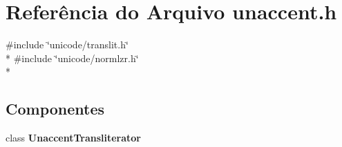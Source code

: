 \section{Referência do Arquivo unaccent.\+h}
\label{unaccent_8h}
{\ttfamily \#include \char`\"{}unicode/translit.\+h\char`\"{}}\\*
{\ttfamily \#include \char`\"{}unicode/normlzr.\+h\char`\"{}}\\*
\subsection*{Componentes}
\begin{DoxyCompactItemize}
\item 
class {\bf Unaccent\+Transliterator}
\end{DoxyCompactItemize}
